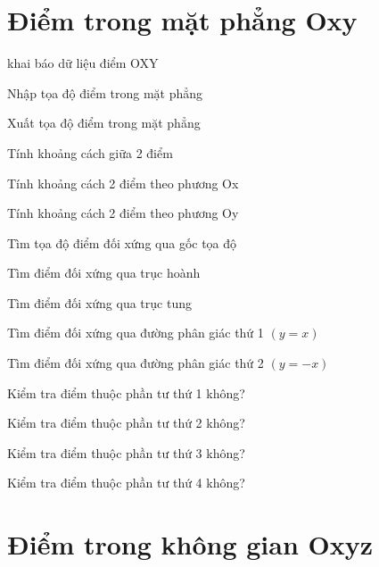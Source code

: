\section{Điểm trong mặt phẳng Oxy}

\begin{problem}
    khai báo dữ liệu điểm OXY
\end{problem}
\begin{problem}
    Nhập tọa độ điểm trong mặt phẳng
\end{problem}
\begin{problem}
    Xuất tọa độ điểm trong mặt phẳng
\end{problem}
\begin{problem}
    Tính khoảng cách giữa 2 điểm
\end{problem}
\begin{problem}
    Tính khoảng cách 2 điểm theo phương Ox
\end{problem}
\begin{problem}
    Tính khoảng cách 2 điểm theo phương Oy
\end{problem}
\begin{problem}
    Tìm tọa độ điểm đối xứng qua gốc tọa độ
\end{problem}
\begin{problem}
    Tìm điểm đối xứng qua trục hoành
\end{problem}
\begin{problem}
    Tìm điểm đối xứng qua trục tung
\end{problem}
\begin{problem}
    Tìm điểm đối xứng qua đường phân giác thứ 1 $(y=x)$
\end{problem}
\begin{problem}
    Tìm điểm đối xứng qua đường phân giác thứ 2 $(y=-x)$
\end{problem}
\begin{problem}
    Kiểm tra điểm thuộc phần tư thứ 1 không?
\end{problem}
\begin{problem}
    Kiểm tra điểm thuộc phần tư thứ 2 không?
\end{problem}
\begin{problem}
    Kiểm tra điểm thuộc phần tư thứ 3 không?
\end{problem}
\begin{problem}
    Kiểm tra điểm thuộc phần tư thứ 4 không?
\end{problem}

\section{Điểm trong không gian Oxyz}

